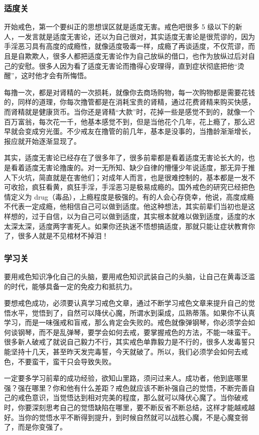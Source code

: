 \subsubsection{适度关}

开始戒色，第一个要纠正的思想误区就是适度无害。戒色吧很多 5 级以下的新人，一发言就是适度无害论，还以为自己很对，其实适度无害论是很荒谬的，因为手淫恶习具有高度的成瘾性，就像适度吸毒一样，成瘾了再谈适度，不仅荒谬，而且是自欺欺人，很多人都把适度无害论作为自己放纵的借口，也作为放纵过后对自己的安慰。很多人因为看了适度无害论而撸得心安理得，直到症状彻底把他“烫醒”，这时他才会有所悔悟。

每撸一次，都是对肾精的一次损耗，就像你去商场购物，每一次购物都是需要花钱的，同样的道理，你每次撸管都是在消耗宝贵的肾精，通过花费肾精来购买快感，而肾精就是健康货币。当你还是肾精“大款”时，花掉一些是感觉不到的，就像一个百万富翁，每次花一千，他基本感觉不到，但是当他花个几年，花上瘾了，那么迟早就会变成穷光蛋。不少戒友在撸管的前几年，基本是没事的，当撸龄渐渐增长，报应就开始逐渐显现了。

其实，适度无害论已经存在了很多年了，很多前辈都是看着适度无害论长大的，也是看着适度无害论撸废的。对一无所知、缺少自律的懵懂少年说适度，那无异于推人下火坑，简直就是在害他们；对成年人而言，也是很难控制的，基本都是一发不可收拾，疯狂看黄，疯狂手淫，手淫恶习是极易成瘾的。国外戒色的研究已经把色情定义为 drug（毒品），上瘾程度是极强的。有的人会心存侥幸，他说，高度成瘾不代表一定成瘾，他相信自己可以做到适度。他这种想法，其实前辈们当初也是这样想的，过于自信，以为自己可以做到适度，其实根本就难以做到适度，适度的水太深太深，适度两字害死人。如果你还执迷不悟想搞适度，那就只能让症状教育你了，很多人就是不见棺材不掉泪！

\subsubsection{学习关}

要用戒色知识净化自己的头脑，要用戒色知识武装自己的头脑，让自己在黄毒泛滥的时代，能够具备一定的免疫力和抵抗力。

要想戒色成功，必须要认真学习戒色文章，通过不断学习戒色文章来提升自己的觉悟水平，觉悟到了，自然可以降伏心魔，所谓水到渠成，瓜熟蒂落。如果你不认真学习，而是一味强戒和盲戒，那么肯定会失败的。戒色就像弹钢琴，你必须学会如何谈钢琴，而不是乱弹琴，要学会如何去戒，要掌握戒色的方法，不能一味蛮干。很多新人破戒了就说自己毅力不行，其实戒色单靠毅力是不行的，很多人发毒誓只能坚持十几天，甚至昨天发完毒誓，今天就破了。所以，我们必须学会如何去戒色，不要蛮干，蛮干只会导致失败。

一定要多学习前辈的成功经验，欲知山里路，须问过来人。成功者，他到底哪里强？强在哪里？你和他有什么差距？戒色就应该不断补强自己的觉悟，不断完善自己的戒色意识，当觉悟达到相对完美的程度，那么就可以降伏心魔了。当你破戒时，你要深刻思考自己的觉悟缺陷在哪里，要不断反省不断总结，这样才能越戒越好。当你的觉悟水平不断得到提升，到时候自然就可以战胜心魔，不是心魔变弱了，而是你变强了。

